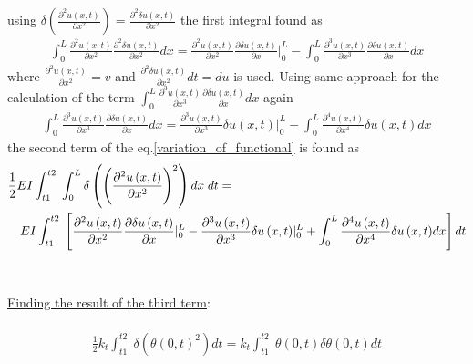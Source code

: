 \documentclass[]{report}
\begin{document}
using  $\delta \left(\frac{\partial^2{u \left(x,t\right)}}{\partial{x^2}}\right)=\frac{\partial^2{\delta u\left(x,t\right)}}{\partial x^2}$ the first integral found as
\begin{eqnarray*}
\int_{0}^{L}   \frac{\partial^2{u\left(x,t\right)}}{\partial{x^2}} \frac{\partial^2{\delta u\left(x,t\right)}}{\partial x^2} dx=    \frac{\partial^2{u\left(x,t\right)}}{\partial{x^2}} \frac{\partial{\delta u\left(x,t\right)}}{\partial x}{|}_{0}^{L}-\int_{0}^{L}   \frac{\partial^3{u\left(x,t\right)}}{\partial{x^3}} \frac{\partial{\delta u\left(x,t\right)}}{\partial x} dx
\end{eqnarray*}
where $\frac{\partial^2{ u\left(x,t\right)}}{\partial{x^2}}=v$ and $\frac{\partial^2{ \delta u\left(x,t\right)}}{\partial{x^2}}dt=du$ is used. Using same approach for the calculation of the term $\int_{0}^{L} \frac{\partial^3{u\left(x,t\right)}}{\partial{x^3}} \frac{\partial{\delta u\left(x,t\right)}}{\partial x} dx$ again 
\begin{eqnarray*}
\int_{0}^{L}   \frac{\partial^3{u\left(x,t\right)}}{\partial{x^3}} \frac{\partial{\delta u\left(x,t\right)}}{\partial x} dx =\frac{\partial^3{u\left(x,t\right)}}{\partial{x^3}} {\delta u\left(x,t\right)}{|}_{0}^{L}-\int_{0}^{L}   \frac{\partial^4{u\left(x,t\right)}}{\partial{x^4}} {\delta u\left(x,t\right)} dx
\end{eqnarray*}
the second term of the eq.\ref{variation_of_functional} is found as
\begin{eqnarray*}
 \lefteqn{\frac{1}{2}E I \int_{t1}^{t2} \;\int_{0}^{L}  \delta\left( {\left(\frac{\partial^2{u\left(x,t\right)}}{\partial{x^2}}\right)}^2\right) dx\; dt=}\\
 & &E I\int_{t1}^{t2} \;\left[ \frac{\partial^2{u\left(x,t\right)}}{\partial{x^2}} \frac{\partial{\delta u\left(x,t\right)}}{\partial x}{|}_{0}^{L}  -\frac{\partial^3{u\left(x,t\right)}}{\partial{x^3}} {\delta u\left(x,t\right)}{|}_{0}^{L} +\int_{0}^{L}   \frac{\partial^4{u\left(x,t\right)}}{\partial{x^4}} {\delta u\left(x,t\right)}dx \right] dt
\end{eqnarray*}
\\
\newpage
~\\
\underline{Finding the result of the third term}:\\
\\
\begin{eqnarray*}
\frac{1}{2}k_t \int_{t1}^{t2} \;\delta \left({\theta{\left(0,t\right)}}^2\right)dt=k_t \int_{t1}^{t2} \;\theta{\left(0,t\right)}\delta {\theta{\left(0,t\right)}}dt
\end{eqnarray*}
\end{document}
